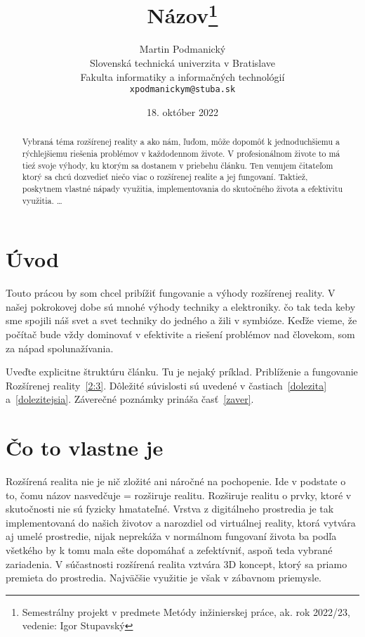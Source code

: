 \documentclass[10pt,twoside,slovak,a4paper]{article}
\title{Názov\thanks{Semestrálny projekt v predmete Metódy inžinierskej práce, ak. rok 2022/23, vedenie: Igor Stupavský}} %
\author{Martin Podmanický\\[2pt]
	{\small Slovenská technická univerzita v Bratislave}\\
	{\small Fakulta informatiky a informačných technológií}\\
	{\small \texttt{xpodmanickym@stuba.sk}}
	}
\date{\small 18. október 2022} %
\begin{document}
\maketitle

\begin{abstract}
Vybraná téma rozšírenej reality a ako nám, ľuďom, môže dopomôť k jednoduchšiemu a rýchlejšiemu riešenia problémov v každodennom živote.
V profesionálnom živote to má tieź svoje výhody, ku ktorým sa dostanem v priebehu článku. 
Ten venujem čitateľom ktorý sa chcú dozvedieť niečo viac o rozšírenej realite a jej fungovaní.
Taktiež, poskytnem vlastné nápady využitia, implementovania do skutočného života a efektivitu využitia.
\ldots
\end{abstract}



\section{Úvod}

Touto prácou by som chcel pribížiť fungovanie a výhody rozšírenej reality. V našej pokrokovej dobe sú mnohé výhody techniky a elektroniky.
čo tak teda keby sme spojili náš svet a svet techniky do jedného a žili v symbióze. Keďže vieme, že počítač bude vždy dominovať v efektivite a riešení problémov nad človekom,
som za nápad spolunažívania.

Uveďte explicitne štruktúru článku. Tu je nejaký príklad.
Priblíženie a fungovanie Rozšírenej reality~\ref{2:3}.
Dôležité súvislosti sú uvedené v častiach~\ref{dolezita} a~\ref{dolezitejsia}.
Záverečné poznámky prináša časť~\ref{zaver}.



\section{Čo to vlastne je} \label{2}

Rozšírená realita nie je nič zložité ani náročné na pochopenie. Ide v podstate o to, čomu názov nasvedčuje = rozširuje realitu. Rozširuje realitu o prvky, ktoré v skutočnosti nie sú fyzicky hmatateľné. Vrstva z digitálneho prostredia je tak implementovaná do našich životov a narozdiel od virtuálnej reality, ktorá vytvára aj umelé prostredie, nijak neprekáža v normálnom fungovaní života ba podľa všetkého by k tomu mala ešte dopomáhať a zefektívniť, aspoň teda vybrané zariadenia. V súčastnosti rozšírená realita vztvára  3D koncept, ktorý sa priamo premieta do prostredia. Najväčšie využitie je však v zábavnom priemysle.
\end{document}
